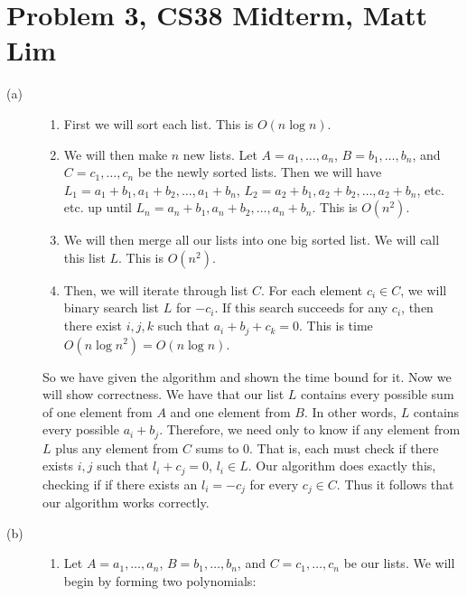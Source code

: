 \documentclass{article}
\begin{document}
\section*{Problem 3, CS38 Midterm, Matt Lim}
\begin{description}
    \item[(a)]
        \begin{enumerate}
            \item First we will sort each list. This is $O(n\log n)$.
            \item We will then make $n$ new lists. Let $A = a_1, \dots, a_n$,
                $B = b_1, \dots, b_n$, and $C = c_1, \dots, c_n$ be the newly sorted
                lists. Then we will have $L_1 = a_1 + b_1, a_1 + b_2, \dots, a_1
                + b_n$, $L_2 = a_2 + b_1, a_2 + b_2, \dots, a_2 + b_n$, etc.
                etc. up until $L_n = a_n + b_1, a_n + b_2, \dots, a_n + b_n$.
                This is $O(n^2)$.
            \item We will then merge all our lists into one big sorted list. We
                will call this list $L$.
                This is $O(n^2)$.
            \item Then, we will iterate through list $C$. For each element $c_i
                \in C$, we will binary search list $L$ for $-c_i$. If this
                search succeeds for any $c_i$, then there exist $i,j,k$ such that
                $a_i + b_j + c_k = 0$. This is time $O(n\log n^2) =
                O(n\log n)$.
        \end{enumerate}
        So we have given the algorithm and shown the time bound for it. Now we
        will show correctness. We have that our list $L$ contains every possible
        sum of one element from $A$ and one element from $B$. In other words,
        $L$ contains every possible $a_i + b_j$. Therefore, we need only to know
        if any element from $L$ plus any element from $C$ sums to $0$. That is,
        each must check if there exists $i,j$ such that $l_i + c_j = 0$, $l_i
        \in L$. Our algorithm does exactly this, checking if if there exists an
        $l_i = -c_j$ for every $c_j \in C$. Thus it follows that our algorithm
        works correctly.
    \item[(b)]
        \begin{enumerate}
            \item Let $A = a_1, \dots, a_n$,
                $B = b_1, \dots, b_n$, and $C = c_1, \dots, c_n$ be our lists.
                We will begin by forming two polynomials:

\end{enumerate}
\end{description}
\end{document}

